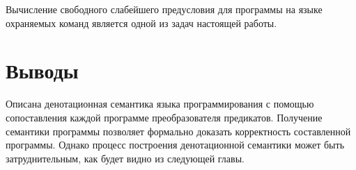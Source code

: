 Вычисление свободного слабейшего предусловия для программы на языке охраняемых команд
является одной из задач настоящей работы.



\section{Выводы} \label{ch1:conclusion}
Описана денотационная семантика языка программирования с помощью сопоставления каждой программе
преобразователя предикатов. Получение семантики программы позволяет формально доказать
корректность составленной программы. Однако процесс построения денотационной семантики может быть
затруднительным, как будет видно из следующей главы.

%

